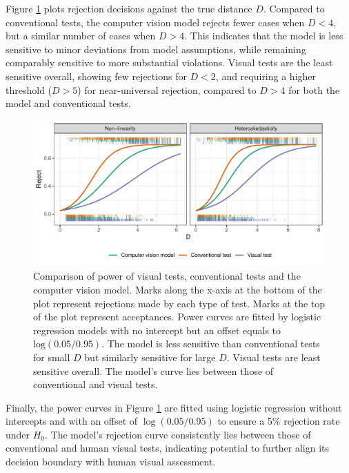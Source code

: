 \documentclass[]{interact}
\theoremstyle{plain}%
\theoremstyle{definition}
\theoremstyle{remark}
\begin{document}
Figure \ref{fig:power} plots rejection decisions against the true
distance \(D\). Compared to conventional tests, the computer vision
model rejects fewer cases when \(D < 4\), but a similar number of cases
when \(D > 4\). This indicates that the model is less sensitive to minor
deviations from model assumptions, while remaining comparably sensitive
to more substantial violations. Visual tests are the least sensitive
overall, showing few rejections for \(D < 2\), and requiring a higher
threshold (\(D > 5\)) for near-universal rejection, compared to
\(D > 4\) for both the model and conventional tests.

\begin{figure}[!h]

{\centering \includegraphics[width=1\linewidth]{paper_files/figure-latex/power-1} 

}

\caption{Comparison of power of visual tests, conventional tests and the computer vision model. Marks along the x-axis at the bottom of the plot represent rejections made by each type of test. Marks at the top of the plot represent acceptances. Power curves are fitted by logistic regression models with no intercept but an offset equals to $\text{log}(0.05/0.95)$. The model is less sensitive than conventional tests for small $D$ but similarly sensitive for large $D$. Visual tests are least sensitive overall. The model’s curve lies between those of conventional and visual tests.}\label{fig:power}
\end{figure}

Finally, the power curves in Figure \ref{fig:power} are fitted using
logistic regression without intercepts and with an offset of
\(\log(0.05/0.95)\) to ensure a 5\% rejection rate under \(H_0\). The
model's rejection curve consistently lies between those of conventional
and human visual tests, indicating potential to further align its
decision boundary with human visual assessment.
\end{document}
